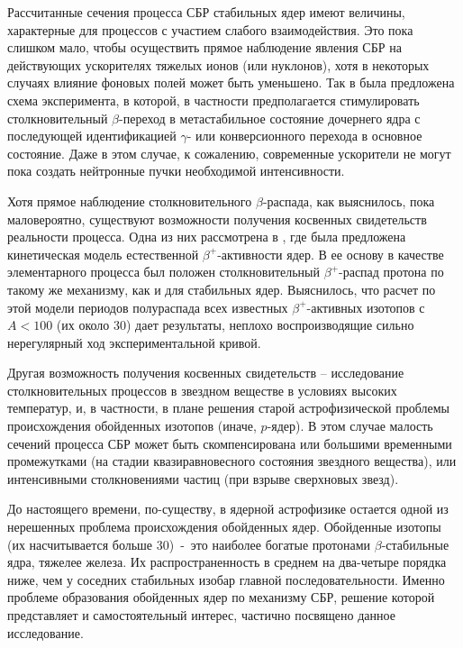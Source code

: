 Рассчитанные сечения процесса СБР стабильных ядер имеют величины, характерные для процессов с участием слабого
взаимодействия. Это пока слишком мало, чтобы осуществить прямое наблюдение явления СБР на действующих ускорителях тяжелых
ионов (или нуклонов), хотя в некоторых случаях влияние фоновых полей может быть уменьшено. Так в \cite{karpov} была
предложена схема эксперимента, в которой, в частности предполагается стимулировать столкновительный $\beta$-переход в
метастабильное состояние дочернего ядра с последующей идентификацией $\gamma$- или конверсионного перехода в основное
состояние. Даже в этом случае, к сожалению, современные ускорители не могут пока создать нейтронные пучки необходимой
интенсивности.

Хотя прямое наблюдение столкновительного $\beta$-распада, как выяснилось, пока маловероятно, существуют  возможности
получения косвенных свидетельств реальности процесса. Одна из них рассмотрена в \cite{huskivadze}, где  была предложена
кинетическая модель естественной
$\beta^+$-активности
ядер. В ее основу в качестве элементарного процесса был положен
столкновительный $\beta^+$-распад протона по такому же механизму,
как и для стабильных ядер. Выяснилось, что расчет по этой модели
периодов полураспада всех известных $\beta^+$-активных изотопов
с $A<100$ (их около 30) дает результаты, неплохо воспроизводящие
сильно нерегулярный  ход экспериментальной кривой.

Другая возможность получения косвенных свидетельств -- исследование
столкновительных процессов в звездном веществе в условиях высоких температур,
и, в частности,
в плане решения старой астрофизической проблемы происхождения обойденных
изотопов (иначе, $p$-ядер).
В этом случае малость сечений процесса СБР может быть
скомпенсирована или большими временными промежутками (на стадии
квазиравновесного состояния звездного вещества), или интенсивными
столкновениями частиц (при взрыве сверхновых звезд).

До настоящего времени, по-существу, в ядерной астрофизике остается
одной из нерешенных  проблема происхождения обойденных
ядер. Обойденные изотопы
(их насчитывается больше 30)~-~это наиболее богатые протонами $\beta$-стабильные
ядра, тяжелее железа. Их распространенность в среднем на два-четыре порядка ниже, чем
у соседних стабильных изобар главной последовательности.
Именно проблеме образования обойденных ядер
по механизму СБР, решение которой представляет и самостоятельный интерес,
частично посвящено данное исследование.


